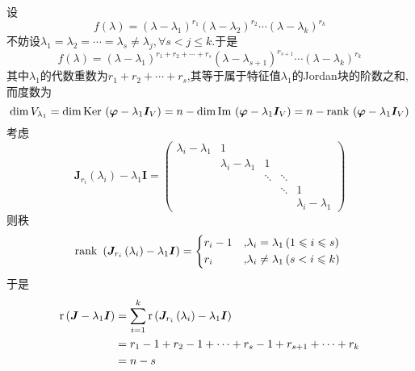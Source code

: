 设\[
    f\left(\lambda\right)=\left(\lambda-\lambda_1\right)^{r_1}\left(\lambda-\lambda_2\right)^{r_2}\cdots\left(\lambda-\lambda_k\right)^{r_k}
\]不妨设$\lambda_1=\lambda_2=\cdots=\lambda_s\neq \lambda_j,\forall s<j\leqslant k.$于是\[
    f\left(\lambda\right)=\left(\lambda-\lambda_1\right)^{r_1+r_2+\cdots+r_s}\left(\lambda-\lambda_{s+1}\right)^{r_{s+1}}\cdots\left(\lambda-\lambda_k\right)^{r_k}
\]其中$\lambda_1$的代数重数为$r_1+r_2+\cdots+r_s$,其等于属于特征值$\lambda_1$的Jordan块的阶数之和,而度数为\[
    \dim V_{\lambda_1}=\dim\operatorname{Ker\,} \left(
    \bm{\varphi}-\lambda_1\bm{I}_V
    \right)=n-\dim\operatorname{Im\,} \left(
    \bm{\varphi}-\lambda_1\bm{I}_V
    \right)=n-\operatorname{rank\,} \left(
    \bm{\varphi}-\lambda_1\bm{I}_V
    \right)
\]考虑\[\bm{J}_{r_i}\left(\lambda_i\right)-\lambda_1\bm{I}=
    \begin{pmatrix}
        \lambda_i-\lambda_1 & 1                   &        &        &                     \\
                            & \lambda_i-\lambda_1 & 1      &                              \\
                            &                     & \ddots & \ddots &                     \\
                            &                     &        & \ddots & 1                   \\
                            &                     &        &        & \lambda_i-\lambda_1
    \end{pmatrix}
\]则秩\[
    \rank \,\left(
    \bm{J}_{r_i}\left(\lambda_i\right)-\lambda_1\bm{I}
    \right)=\begin{cases*}
        r_i-1 & ,$\lambda_i=\lambda_1\left(1\leqslant i\leqslant s\right)$ \\
        r_i   & ,$\lambda_i\neq \lambda_1\left(s<i\leqslant k\right)$
    \end{cases*}
\]于是\begin{align*}
    \mathrm{r} \left(\bm{J}-\lambda_1\bm{I}\right) & =\sum_{i=1}^k\mathrm{r} \left(
    \bm{J}_{r_i}\left(\lambda_i\right)-\lambda_1\bm{I}
    \right)                                                                                 \\
                                             & =r_1-1+r_2-1+\cdots+r_s-1+r_{s+1}+\cdots+r_k \\
                                             & =n-s
\end{align*}
